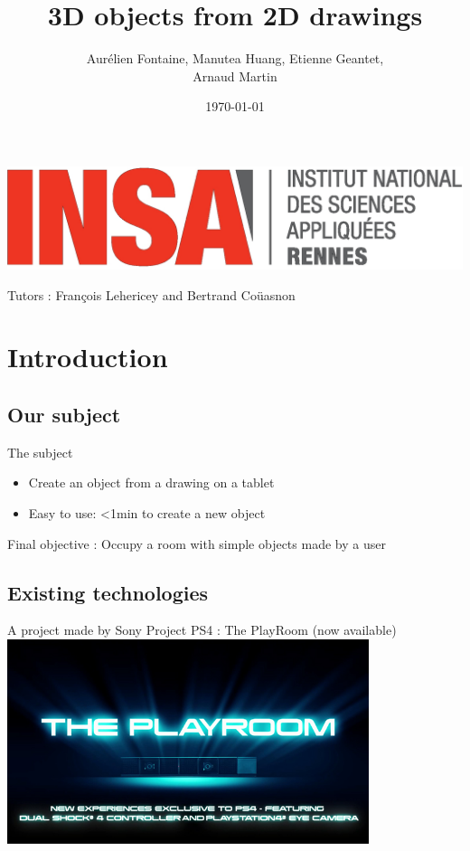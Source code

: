 \documentclass[a4paper,10pt]{beamer}
\title{3D objects from 2D drawings}
\author[Groupe 3INFO]{Aurélien Fontaine, Manutea Huang, Etienne Geantet,\\ Arnaud Martin}
\institute[INSA de Rennes]{Institut National des Sciences Appliquées de Rennes}
\date{\today}
\begin{document}
	\begin{frame}
		\begin{titlepage}
			\centerline{\includegraphics[scale=0.1]{images/logos/logoINSA.jpg}}
			\centerline{Tutors : François Lehericey and Bertrand Coüasnon}	
		\end{titlepage}
	\end{frame}
	
	
	
	\section{Introduction}
	
		\subsection{Our subject}
	
			\begin{frame}{The subject}
				\begin{itemize}
					\item Create an object from a drawing on a tablet
					\item Easy to use: <1min to create a new object
				\end{itemize}
				Final objective : Occupy a room with simple objects made by a user
			\end{frame}
			
	\begin{frame}
		\tableofcontents
	\end{frame}
		
		\subsection{Existing technologies}
			
			\begin{frame}{A project made by Sony}
				Project PS4 : The PlayRoom (now available)
				\href{run:The_PlayRoom.avi}{\includegraphics[width=300pt]{images/The-Playroom.jpg}}
			\end{frame}
			
\end{document}
